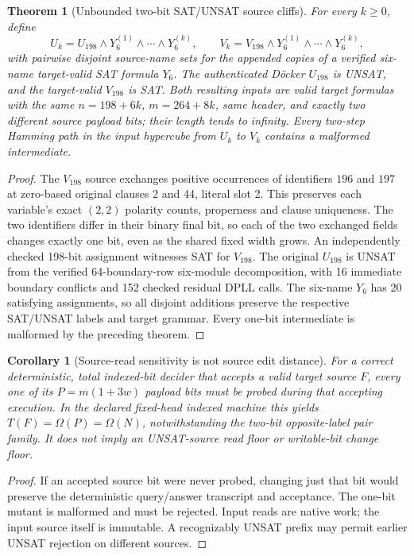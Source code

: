 \documentclass[11pt]{article}
\newtheorem{theorem}{Theorem}
\newtheorem{corollary}{Corollary}
\begin{document}
\begin{theorem}[Unbounded two-bit SAT/UNSAT source cliffs]
For every $k\ge0$, define
\[
U_k=U_{198}\wedge Y_6^{(1)}\wedge\cdots\wedge Y_6^{(k)},\qquad
V_k=V_{198}\wedge Y_6^{(1)}\wedge\cdots\wedge Y_6^{(k)},
\]
with pairwise disjoint source-name sets for the appended copies of a verified six-name target-valid SAT formula $Y_6$. The authenticated D\"ocker $U_{198}$ is UNSAT, and the target-valid $V_{198}$ is SAT. Both resulting inputs are valid target formulas with the same $n=198+6k$, $m=264+8k$, same header, and \emph{exactly two different source payload bits}; their length tends to infinity. Every two-step Hamming path in the input hypercube from $U_k$ to $V_k$ contains a malformed intermediate.
\end{theorem}
\begin{proof}
The $V_{198}$ source exchanges positive occurrences of identifiers $196$ and $197$ at zero-based original clauses 2 and 44, literal slot 2. This preserves each variable's exact $(2,2)$ polarity counts, properness and clause uniqueness. The two identifiers differ in their binary final bit, so each of the two exchanged fields changes exactly one bit, even as the shared fixed width grows. An independently checked 198-bit assignment witnesses SAT for $V_{198}$. The original $U_{198}$ is UNSAT from the verified 64-boundary-row six-module decomposition, with 16 immediate boundary conflicts and 152 checked residual DPLL calls. The six-name $Y_6$ has 20 satisfying assignments, so all disjoint additions preserve the respective SAT/UNSAT labels and target grammar. Every one-bit intermediate is malformed by the preceding theorem.
\end{proof}

\begin{corollary}[Source-read sensitivity is not source edit distance]
For a correct \emph{deterministic, total} indexed-bit decider that accepts a valid target source $F$, every one of its $P=m(1+3w)$ payload bits must be probed during that accepting execution. In the declared fixed-head indexed machine this yields $T(F)=\Omega(P)=\Omega(N)$, notwithstanding the two-bit opposite-label pair family. It does not imply an UNSAT-source read floor or writable-bit change floor.
\end{corollary}
\begin{proof}
If an accepted source bit were never probed, changing just that bit would preserve the deterministic query/answer transcript and acceptance. The one-bit mutant is malformed and must be rejected. Input reads are native work; the input source itself is immutable. A recognizably UNSAT prefix may permit earlier UNSAT rejection on different sources.
\end{proof}
\end{document}

